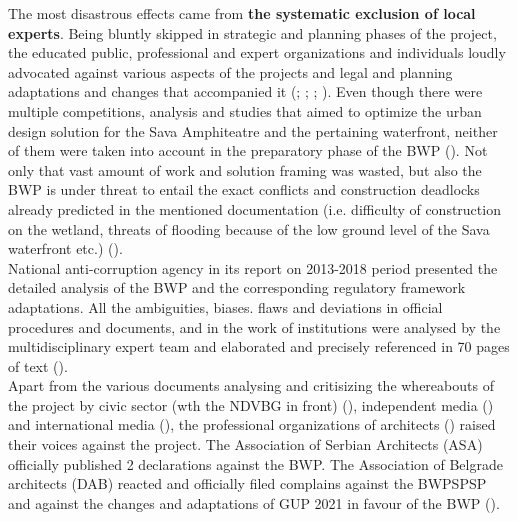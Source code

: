 \documentclass[11pt]{report}
\begin{document}
The most disastrous effects came from \textbf{the systematic exclusion of local experts}.
Being bluntly skipped in strategic and planning phases of the project, the educated public, professional and expert organizations and individuals loudly advocated against various aspects of the projects and legal and planning adaptations and changes that accompanied it 
(\citealt{stojkov_crne_2015}; \citealt{stojkov_zaboravljene_2015}; \citealt{stojkov_sahrana_2015}; \citealt{stojkov_djindjuve_2015}).
Even though there were multiple competitions, analysis and studies that aimed to optimize the urban design solution for the Sava Amphiteatre and the pertaining waterfront, neither of them were taken into account in the preparatory phase of the BWP (\cite{projects}).
Not only that vast amount of work and solution framing was wasted, but also the BWP is under threat to entail the exact conflicts and construction deadlocks already predicted in the mentioned documentation (i.e. difficulty of construction on the wetland, threats of flooding because of the low ground level of the Sava waterfront etc.) (\cite{projects}).
\\

National anti-corruption agency in its report on 2013-2018 period presented the detailed analysis of the BWP and the corresponding regulatory framework adaptations. All the ambiguities, biases. flaws and deviations in official procedures and documents, and in the work of institutions were analysed by the multidisciplinary expert team and elaborated and precisely referenced in 70 pages of text (\citealt{pravni_skener_alternativni_2016}).
\\

Apart from the various documents analysing and critisizing the whereabouts of the project by civic sector (wth the NDVBG in front) (\cite{ref doks}), independent media (\cite{imena and ref}) and international media (\cite{ref Gardian}), the professional organizations of architects (\cite{ref}) raised their voices against the project.
The Association of Serbian Architects (ASA) officially published 2 declarations against the BWP. 
The Association of Belgrade architects (DAB) reacted and officially filed complains against the BWPSPSP and against the changes and adaptations of GUP 2021 in favour of the BWP (\cite{ref}).
\\
\end{document}

